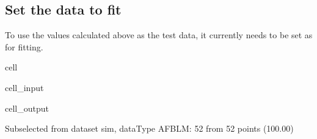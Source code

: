 \documentclass[letterpaper,table,10pt,english]{jupyterBook}
\begin{document}
\subsection{Set the data to fit}
\label{\detokenize{part2/basic_fitting_numerics_intro_260723:set-the-data-to-fit}}
\sphinxAtStartPar
To use the values calculated above as the test data, it currently needs to be set as  for fitting.

\begin{sphinxuseclass}{cell}\begin{sphinxVerbatimInput}

\begin{sphinxuseclass}{cell_input}
\begin{sphinxVerbatim}[commandchars=\\\{\}]


   
\end{sphinxVerbatim}

\end{sphinxuseclass}\end{sphinxVerbatimInput}
\begin{sphinxVerbatimOutput}

\begin{sphinxuseclass}{cell_output}
\begin{sphinxVerbatim}[commandchars=\\\{\}]
Subselected from dataset \PYGZsq{}sim\PYGZsq{}, dataType \PYGZsq{}AFBLM\PYGZsq{}: 52 from 52 points (100.00\PYGZpc{})
\end{sphinxVerbatim}

\end{sphinxuseclass}\end{sphinxVerbatimOutput}

\end{sphinxuseclass}
\end{document}
